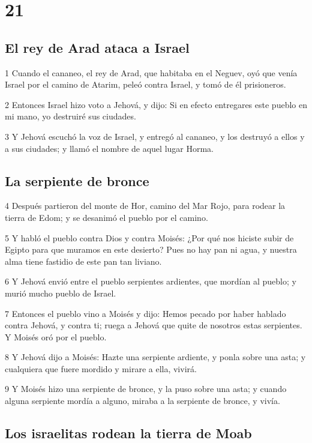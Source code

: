 \chapter{21}

\section*{El rey de Arad ataca a Israel}

\par 1 Cuando el cananeo, el rey de Arad, que habitaba en el Neguev, oyó que venía Israel  por el camino de Atarim, peleó contra Israel, y tomó de él prisioneros.
\par 2 Entonces Israel hizo voto a Jehová, y dijo: Si en efecto entregares este pueblo en mi mano, yo destruiré sus ciudades.
\par 3 Y Jehová escuchó la voz de Israel, y entregó al cananeo, y los destruyó a ellos y a sus ciudades; y llamó el nombre de aquel lugar Horma.

\section*{La serpiente de bronce }

\par 4 Después partieron del monte de Hor, camino del Mar Rojo, para rodear la tierra de Edom; y se desanimó el pueblo por el camino.
\par 5 Y habló el pueblo contra Dios y contra Moisés: ¿Por qué nos hiciste subir de Egipto para que muramos en este desierto? Pues no hay pan ni agua, y nuestra alma tiene fastidio de este pan tan liviano.
\par 6 Y Jehová envió entre el pueblo serpientes ardientes, que mordían al pueblo; y murió mucho pueblo de Israel.
\par 7 Entonces el pueblo vino a Moisés y dijo: Hemos pecado por haber hablado contra Jehová, y contra ti; ruega a Jehová que quite de nosotros estas serpientes. Y Moisés oró por el pueblo.
\par 8 Y Jehová dijo a Moisés: Hazte una serpiente ardiente, y ponla sobre una asta; y cualquiera que fuere mordido y mirare a ella, vivirá.
\par 9 Y Moisés hizo una serpiente de bronce, y la puso sobre una asta; y cuando alguna serpiente mordía a alguno, miraba a la serpiente de bronce, y vivía.

\section*{Los israelitas rodean la tierra de Moab}

